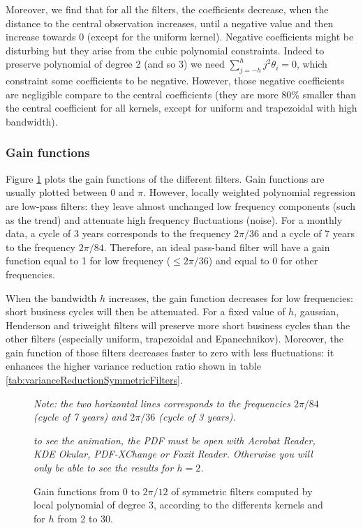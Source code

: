 \documentclass[
  12pt,
  ,
  a4paper]{article}
\newcommand\1{\mathds{1}}
\begin{document}
Moreover, we find that for all the filters, the coefficients decrease, when the distance to the central observation increases, until a negative value and then increase towards 0 (except for the uniform kernel).
Negative coefficients might be disturbing but they arise from the cubic polynomial constraints.
Indeed to preserve polynomial of degree 2 (and so 3) we need \(\sum_{j=-h}^hj^2\theta_i=0\), which constraint some coefficients to be negative.
However, those negative coefficients are negligible compare to the central coefficients (they are more 80\% smaller than the central coefficient for all kernels, except for uniform and trapezoidal with high bandwidth).

\hypertarget{gain-functions}{%
\subsubsection{Gain functions}\label{gain-functions}}

Figure \ref{fig:filtersSymgains} plots the gain functions of the different filters.
Gain functions are usually plotted between 0 and \(\pi\).
However, locally weighted polynomial regression are low-pass filters: they leave almost unchanged low frequency components (such as the trend) and attenuate high frequency fluctuations (noise).
For a monthly data, a cycle of 3 years corresponds to the frequency \(2\pi/36\) and a cycle of 7 years to the frequency \(2\pi/84\).
Therefore, an ideal pass-band filter will have a gain function equal to 1 for low frequency (\(\leq 2\pi/36\)) and equal to 0 for other frequencies.

When the bandwidth \(h\) increases, the gain function decreases for low frequencies: short business cycles will then be attenuated.
For a fixed value of \(h\), gaussian, Henderson and triweight filters will preserve more short business cycles than the other filters (especially uniform, trapezoidal and Epanechnikov).
Moreover, the gain function of those filters decreases faster to zero with less fluctuations: it enhances the higher variance reduction ratio shown in table \ref{tab:varianceReductionSymmetricFilters}.

\begin{figure}[!ht]
\caption{Gain functions from 0 to $2\pi/12$ of symmetric filters computed by local polynomial of degree $3$, according to the differents kernels and for $h$ from 2 to 30.}\label{fig:filtersSymgains}\footnotesize
\emph{Note: the two horizontal lines corresponds to the frequencies $2\pi/84$ (cycle of 7 years) and $2\pi/36$ (cycle of 3 years).}

\emph{to see the animation, the PDF must be open with Acrobat Reader, KDE Okular, PDF-XChange or Foxit Reader.
Otherwise you will only be able to see the results for $h=2$.}
\end{figure}
\end{document}
